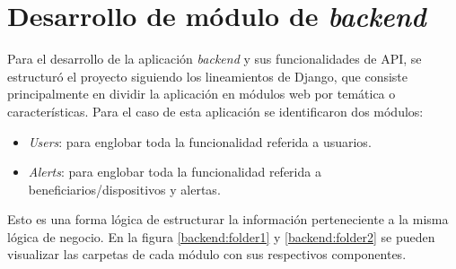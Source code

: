 \section{Desarrollo de módulo de \textit{backend}}

Para el desarrollo de la aplicación \textit{backend} y sus funcionalidades de API, se estructuró el proyecto siguiendo los lineamientos de Django, que consiste principalmente en dividir la aplicación en módulos web por temática o características. Para el caso de esta aplicación se identificaron dos módulos:
\begin{itemize}
	\item \textit{Users}: para englobar toda la funcionalidad referida a usuarios.
	\item \textit{Alerts}: para englobar toda la funcionalidad referida a beneficiarios/dispositivos y alertas.
\end{itemize}

Esto es una forma lógica de estructurar la información perteneciente a la misma lógica de negocio. En la figura \ref{backend:folder1} y \ref{backend:folder2} se pueden visualizar las carpetas de cada módulo con sus respectivos componentes.


